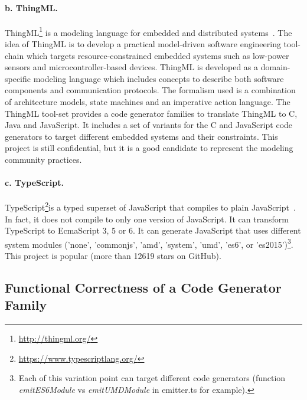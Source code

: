 \paragraph{b. ThingML.} ThingML\footnote{\url{http://thingml.org/}} is a modeling language for embedded and distributed systems~\cite{fleurey2011mde}. The idea of ThingML is to develop a practical model-driven software engineering tool-chain which targets resource-constrained embedded systems such as low-power sensors and microcontroller-based devices. ThingML is developed as a domain-specific modeling language which includes concepts to describe both software components and communication protocols. The formalism used is a combination of architecture models, state machines and an imperative action language. The ThingML tool-set provides a  code generator families  to translate ThingML to C, Java and JavaScript. It includes a set of variants for the C and JavaScript code generators to target different embedded systems and their constraints. 
This project is still confidential, but it is a good candidate to represent the modeling community practices.
 
\paragraph{c. TypeScript.} TypeScript\footnote{\url{https://www.typescriptlang.org/}}is a typed superset of JavaScript that compiles to plain JavaScript~\cite{rastogi2015safe}. In fact, it does not compile to only one version of JavaScript. It can transform TypeScript to EcmaScript 3, 5 or 6. It can generate JavaScript that uses different system modules ('none', 'commonjs', 'amd', 'system', 'umd', 'es6', or 'es2015')\footnote{Each of this variation point can target different code generators (function \textit{emitES6Module} vs \textit{emitUMDModule} in emitter.ts for example).}. 
This project is popular (more than \num{12619} stars on GitHub).


\subsection{Functional Correctness of a Code Generator Family}

